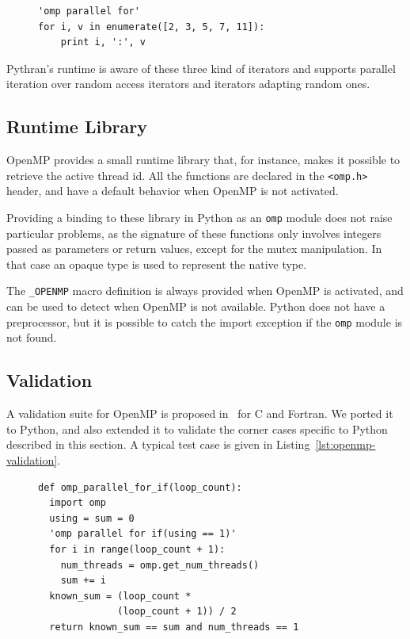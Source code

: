 \documentclass{sigplanconf}
\begin{document}
\begin{figure}
    \begin{lstlisting}[label={lst:complex-omp-for}, caption={Parallel
    loop in Pythran with tuple unpacking.}]
'omp parallel for'
for i, v in enumerate([2, 3, 5, 7, 11]):
    print i, ':', v
  \end{lstlisting}
\end{figure}

Pythran's runtime is aware of these three kind of iterators and supports
parallel iteration over random access iterators and iterators adapting random
ones.

\subsection{Runtime Library}

OpenMP provides a small runtime library that, for instance, makes it possible to
retrieve the active thread id. All the functions are declared in the
\texttt{<omp.h>} header, and have a default behavior when OpenMP is not
activated.

Providing a binding to these library in Python as an \texttt{omp} module does
not raise particular problems, as the signature of these functions only involves
integers passed as parameters or return values, except for the mutex
manipulation. In that case an opaque type is used to represent the native type.

The \texttt{\_OPENMP} macro definition is always provided when OpenMP is
activated, and can be used to detect when OpenMP is not available. Python does
not have a preprocessor, but it is possible to catch the import exception if the
\texttt{omp} module is not found.

\subsection{Validation}

A validation suite for OpenMP is proposed in~\cite{wang2012} for C and Fortran.
We ported it to Python, and also extended it to validate the corner cases
specific to Python described in this section. A typical test case is given in
Listing~\ref{lst:openmp-validation}.

\begin{figure}
    \begin{lstlisting}[label={lst:openmp-validation},caption={Example of Python
    OpenMP validation test case.}]
def omp_parallel_for_if(loop_count):
  import omp
  using = sum = 0
  'omp parallel for if(using == 1)'
  for i in range(loop_count + 1):
    num_threads = omp.get_num_threads()
    sum += i
  known_sum = (loop_count *
              (loop_count + 1)) / 2
  return known_sum == sum and num_threads == 1
    \end{lstlisting}
\end{figure}
\end{document}
